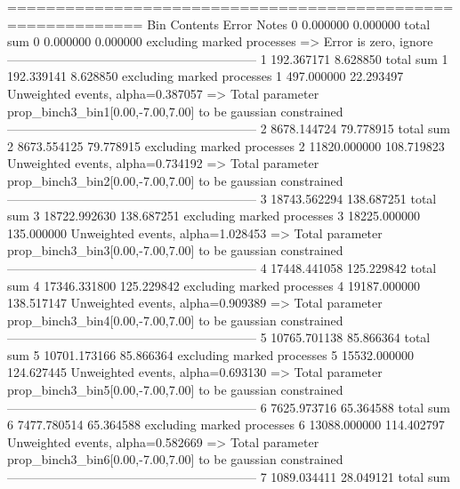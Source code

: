 ============================================================
Bin        Contents        Error           Notes                         
0          0.000000        0.000000        total sum                     
0          0.000000        0.000000        excluding marked processes    
  => Error is zero, ignore      
------------------------------------------------------------
1          192.367171      8.628850        total sum                     
1          192.339141      8.628850        excluding marked processes    
1          497.000000      22.293497       Unweighted events, alpha=0.387057
  => Total parameter prop_binch3_bin1[0.00,-7.00,7.00] to be gaussian constrained
------------------------------------------------------------
2          8678.144724     79.778915       total sum                     
2          8673.554125     79.778915       excluding marked processes    
2          11820.000000    108.719823      Unweighted events, alpha=0.734192
  => Total parameter prop_binch3_bin2[0.00,-7.00,7.00] to be gaussian constrained
------------------------------------------------------------
3          18743.562294    138.687251      total sum                     
3          18722.992630    138.687251      excluding marked processes    
3          18225.000000    135.000000      Unweighted events, alpha=1.028453
  => Total parameter prop_binch3_bin3[0.00,-7.00,7.00] to be gaussian constrained
------------------------------------------------------------
4          17448.441058    125.229842      total sum                     
4          17346.331800    125.229842      excluding marked processes    
4          19187.000000    138.517147      Unweighted events, alpha=0.909389
  => Total parameter prop_binch3_bin4[0.00,-7.00,7.00] to be gaussian constrained
------------------------------------------------------------
5          10765.701138    85.866364       total sum                     
5          10701.173166    85.866364       excluding marked processes    
5          15532.000000    124.627445      Unweighted events, alpha=0.693130
  => Total parameter prop_binch3_bin5[0.00,-7.00,7.00] to be gaussian constrained
------------------------------------------------------------
6          7625.973716     65.364588       total sum                     
6          7477.780514     65.364588       excluding marked processes    
6          13088.000000    114.402797      Unweighted events, alpha=0.582669
  => Total parameter prop_binch3_bin6[0.00,-7.00,7.00] to be gaussian constrained
------------------------------------------------------------
7          1089.034411     28.049121       total sum                     
